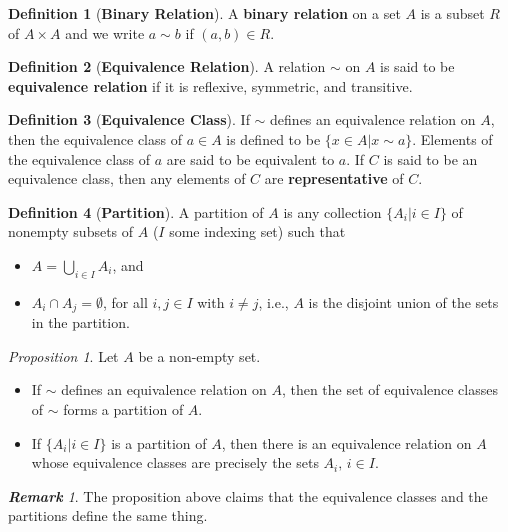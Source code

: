 \documentclass[paper=a4, fontsize=11pt]{scrartcl}
\numberwithin{equation}{section}		%
\numberwithin{figure}{section}			%
\numberwithin{table}{section}				%
\theoremstyle{definition}
\newtheorem{definition}{Definition}[section]
\theoremstyle{remark}
\newtheorem*{remark}{\textbf{Remark}}
\theoremstyle{example}
\newtheorem{prop}{Proposition}[section]
\begin{document}
\begin{definition}[\textbf{Binary Relation}]
    A \textbf{binary relation} on a set $A$ is a subset $R$ of $A \times A$ and we write $a \sim b$ if $(a,b) \in R$.
\end{definition}

\begin{definition}[\textbf{Equivalence Relation}]
    A relation $\sim$ on $A$ is said to be \textbf{equivalence relation} if it is reflexive, symmetric, and transitive.
\end{definition}

\begin{definition}[\textbf{Equivalence Class}]
    If $\sim$ defines an equivalence relation on $A$, then the equivalence class of $a \in A$ is defined to be $\{x \in A \lvert x \sim a\}$. Elements of the equivalence class of $a$ are said to be equivalent to $a$. If $C$ is said to be an equivalence class, then any elements of $C$ are \textbf{representative} of $C$.
\end{definition}

\begin{definition}[\textbf{Partition}]
    A partition of $A$ is any collection $\{A_i \lvert i \in I\}$ of nonempty subsets of $A$ ($I$ some indexing set) such that
    \begin{itemize}
        \item $A = \bigcup_{i\in I}A_i$, and
        \item $A_i \cap A_j = \emptyset$, for all $i,j \in I$ with $i \neq j$, i.e., $A$ is the disjoint union of the sets in the partition.
    \end{itemize}
\end{definition}

\begin{prop}
    Let $A$ be a non-empty set.
    \begin{itemize}
        \item If $\sim$ defines an equivalence relation on $A$, then the set of equivalence classes of $\sim$ forms a partition of $A$.
        \item If $\{A_i \lvert i \in I\}$ is a partition of $A$, then there is an equivalence relation on $A$ whose equivalence classes are precisely the sets $A_i, \, i \in I$.
    \end{itemize}
\end{prop}

\begin{remark}
    The proposition above claims that the equivalence classes and the partitions define the same thing.
\end{remark}
\end{document}
